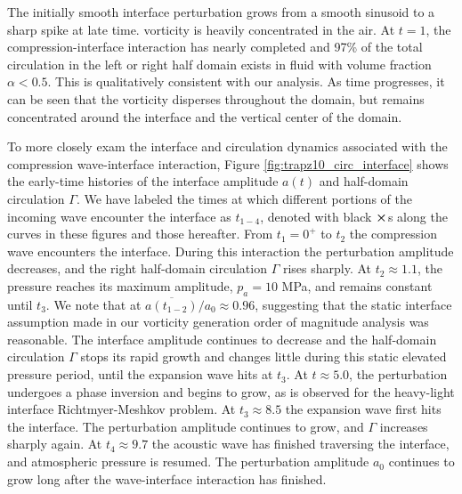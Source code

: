The initially smooth interface perturbation grows from a smooth
sinusoid to a sharp spike at late time.  vorticity is heavily
concentrated in the air. At $t=1$, the compression-interface
interaction has nearly completed and 97\% of the total circulation in
the left or right half domain exists in fluid with volume fraction
$\alpha<0.5$. This is qualitatively consistent with our analysis. As
time progresses, it can be seen that the vorticity disperses
throughout the domain, but remains concentrated around the interface
and the vertical center of the domain.

To more closely exam the interface and circulation dynamics associated
with the compression wave-interface interaction, Figure
\ref{fig:trapz10_circ_interface} shows the early-time histories of the
interface amplitude $a(t)$ and half-domain circulation $\Gamma$. We
have labeled the times at which different portions of the incoming
wave encounter the interface as $t_{1-4}$, denoted with black
$\boldsymbol{\times}$s along the curves in these figures and those
hereafter. From $t_1=0^+$ to $t_2$ the compression wave encounters the
interface. During this interaction the perturbation amplitude
decreases, and the right half-domain circulation $\Gamma$ rises
sharply. At $t_2\approx1.1$, the pressure reaches its maximum
amplitude, $p_a=10$ MPa, and remains constant until $t_3$. We note
that at $\overline{a(t_{1-2})}/a_0\approx0.96$, suggesting that the
static interface assumption made in our vorticity generation order of
magnitude analysis was reasonable. The interface amplitude continues
to decrease and the half-domain circulation $\Gamma$ stops its rapid
growth and changes little during this static elevated pressure period,
until the expansion wave hits at $t_3$. At $t\approx 5.0$, the
perturbation undergoes a phase inversion and begins to grow, as is
observed for the heavy-light interface Richtmyer-Meshkov problem. At
$t_3\approx8.5$ the expansion wave first hits the interface. The
perturbation amplitude continues to grow, and $\Gamma$ increases
sharply again. At $t_4\approx9.7$ the acoustic wave has finished
traversing the interface, and atmospheric pressure is resumed. The
perturbation amplitude $a_0$ continues to grow long after the
wave-interface interaction has finished.
%
